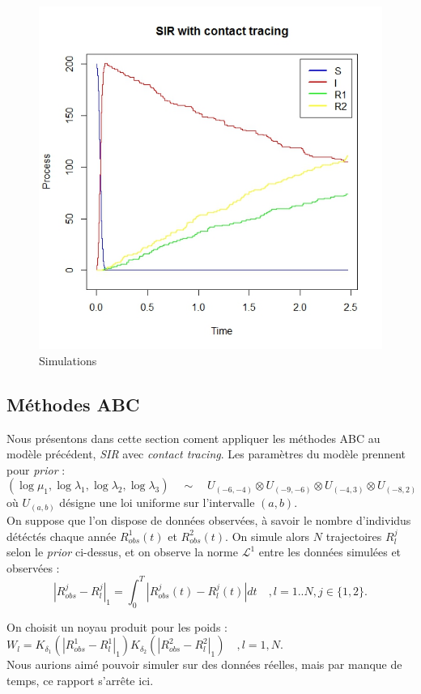 \documentclass{article}
\theoremstyle{definition}
\begin{document}
\begin{figure}[!h]\centering
\includegraphics[scale=0.4]{SIR.jpeg}
\caption{Simulations}
\label{SIRCT}
\end{figure}

\subsection{Méthodes ABC}

Nous présentons dans cette section coment appliquer les méthodes ABC au modèle précédent, \textit{SIR} avec \textit{contact tracing}. Les paramètres du modèle prennent pour \textit{prior} :
\[(\log \mu_1, \log \lambda_1, \log \lambda_2,\log \lambda_3) \quad \sim \quad U_{(-6,-4)}\otimes U_{(-9,-6)} \otimes U_{(-4,3)} \otimes U_{(-8,2)} \]
où $U_{(a,b)}$ désigne une loi uniforme sur l'intervalle $(a,b)$.\\

On suppose que l'on dispose de données observées, à savoir le nombre d'individus détéctés chaque année $R^1_{obs}(t)$ et $R^2_{obs}(t)$. On simule alors $N$ trajectoires $R^j_l$ selon le \textit{prior} ci-dessus, et on observe la norme $\mathcal L^1$ entre les données simulées et observées :
\[|R^j_{obs}-R^j_{l}|_1=\int_0^T |R^j_{obs}(t)-R^j_{l}(t)| dt \quad , l=1..N, j\in\{1,2\}.\]

On choisit un noyau produit pour les poids : $W_l=K_{\delta_1}(|R^1_{obs}-R^1_{l}|_1)K_{\delta_2}(|R^2_{obs}-R^2_{l}|_1)\quad, l = 1,N$.\\

Nous aurions aimé pouvoir simuler sur des données réelles, mais par manque de temps, ce rapport s'arrête ici.
\newpage


 
\nocite{*}
\end{document}

